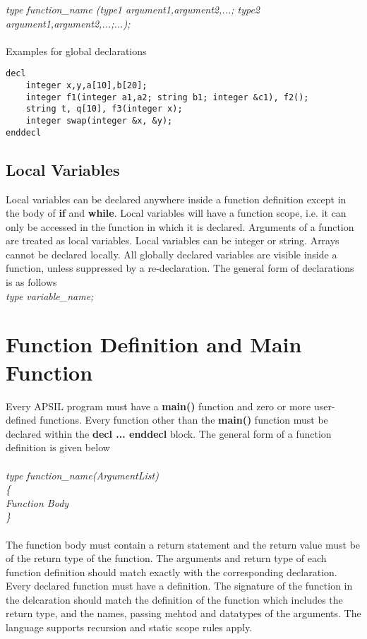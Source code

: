 \textit{type function\_name (type1 argument1,argument2,...; type2 argument1,argument2,...;...);}
\\
\\
Examples for global declarations
\begin{lstlisting}
decl
	integer x,y,a[10],b[20];	
	integer f1(integer a1,a2; string b1; integer &c1), f2(); 
	string t, q[10], f3(integer x); 
	integer swap(integer &x, &y);	 
enddecl
\end{lstlisting}





\subsection{Local Variables}
Local variables can be declared anywhere inside a function definition except in the body of \textbf{if} and \textbf{while}. Local variables will have a function scope, i.e. it can only be accessed in the function in which it is declared. Arguments of a function are treated as local variables. Local variables can be integer or string. Arrays cannot be declared locally. All globally declared variables are visible inside a function, unless suppressed by a re-declaration. The general form of declarations is as follows \\

\textit{type variable\_name;} 






\section{Function Definition and Main Function}

Every APSIL program must have a \textbf{main()} function and zero or more user-defined functions. Every function other than the \textbf{main()} function must be declared within the \textbf{decl ... enddecl} block. The general form of a function definition is given below 
\\
\\
\textit{
type function\_name(ArgumentList) \\ \{ \\
  Function Body \\
\}
}
\\
\\
The function body must contain a return statement and the return value must be of the return type of the function. The arguments and return type of each function definition should match exactly with the corresponding declaration. Every declared function must have a definition. The signature of the function in the delcaration should match the definition of the function which includes the return type, and the names, passing mehtod and datatypes of the arguments. The language supports recursion and static scope rules apply.




